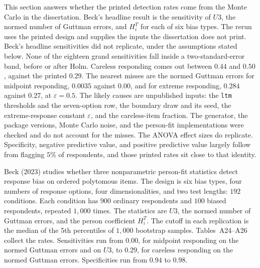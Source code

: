 \documentclass[11pt]{article}
\begin{document}
This section answers whether the printed detection rates come from the
Monte Carlo in the dissertation.
Beck's headline result is the sensitivity of \(U3\), the normed number
of Guttman errors, and \(H_i^T\) for each of six bias types.
The rerun uses the printed design and supplies the inputs the
dissertation does not print.
Beck's headline sensitivities did not replicate, under the assumptions
stated below.
None of the eighteen grand sensitivities fall inside a
two-standard-error band, before or after Holm.
Careless responding comes out between \(0.44\) and \(0.50\), against
the printed \(0.29\).
The nearest misses are the normed Guttman errors for midpoint
responding, \(0.0035\) against \(0.00\), and for extreme responding,
\(0.284\) against \(0.27\), at \(\varepsilon=0.5\).
The likely causes are unpublished inputs: the \texttt{ltm} thresholds
and the seven-option row, the boundary draw and its seed, the
extreme-response constant \(\varepsilon\), and the careless-item
fraction.
The generator, the package versions, Monte Carlo noise, and the
person-fit implementations were checked and do not account for the
misses.
The ANOVA effect sizes do replicate.
Specificity, negative predictive value, and positive predictive value
largely follow from flagging \(5\%\) of respondents, and those printed
rates sit close to that identity.

Beck (2023) \cite{beck2023} studies whether three nonparametric
person-fit statistics detect response bias on ordered polytomous items.
The design is six bias types, four numbers of response options, four
dimensionalities, and two test lengths: \(192\) conditions.
Each condition has \(900\) ordinary respondents and \(100\) biased
respondents, repeated \(1{,}000\) times.
The statistics are \(U3\), the normed number of Guttman errors, and the
person coefficient \(H_i^T\).
The cutoff in each replication is the median of the 5th percentiles of
\(1{,}000\) bootstrap samples.
Tables~A24--A26 collect the rates.
Sensitivities run from \(0.00\), for midpoint responding on the normed
Guttman errors and on \(U3\), to \(0.29\), for careless responding on
the normed Guttman errors.
Specificities run from \(0.94\) to \(0.98\).
\end{document}
